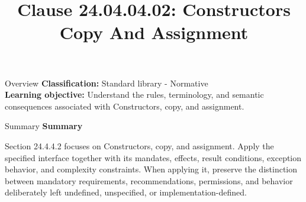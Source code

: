 \documentclass[10pt,letterpaper]{article}
\title{Clause 24.04.04.02: Constructors Copy And Assignment}
\author{}
\date{}
\begin{document}
\maketitle
\begin{CornellOverviewBox}{Overview}
\textbf{Classification:} Standard library - Normative\\[2pt]
\textbf{Learning objective:} Understand the rules, terminology, and semantic consequences associated with Constructors, copy, and assignment.
\end{CornellOverviewBox}\begin{CornellSummaryBox}{Summary}
{\sffamily\bfseries\color{Accent} Summary}\par\vspace{3pt}Section 24.4.4.2 focuses on Constructors, copy, and assignment. Apply the specified interface together with its mandates, effects, result conditions, exception behavior, and complexity constraints. When applying it, preserve the distinction between mandatory requirements, recommendations, permissions, and behavior deliberately left undefined, unspecified, or implementation-defined.
\end{CornellSummaryBox}
\end{document}
